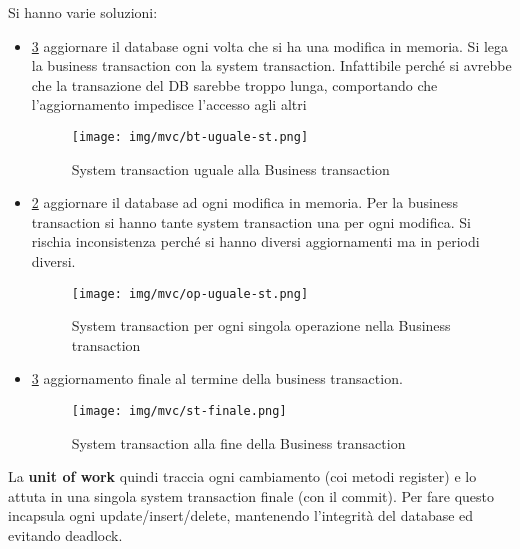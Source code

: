 Si hanno varie soluzioni:
\begin{itemize}
	\item \ref{fig:bt-uguale-st} aggiornare il database ogni volta che si ha una modifica in memoria. 
      Si lega la business transaction con la system transaction. Infattibile 
      perché si avrebbe che la transazione del DB sarebbe troppo lunga, 
      comportando che l'aggiornamento impedisce l'accesso agli altri
      \begin{figure}[!ht]
            \centering
            \texttt{[image: img/mvc/bt-uguale-st.png]}
            \caption{System transaction uguale alla Business transaction}
            \label{fig:bt-uguale-st}
      \end{figure}
	\item \ref{fig:op-uguale-st}  aggiornare il database ad ogni modifica in memoria. Per la business 
      transaction  si hanno tante system transaction una per ogni modifica. Si 
      rischia inconsistenza perché si hanno diversi aggiornamenti ma in periodi 
      diversi.
      \begin{figure}[!ht]
            \centering
            \texttt{[image: img/mvc/op-uguale-st.png]}
            \caption{System transaction per ogni singola operazione nella Business
            transaction}
            \label{fig:op-uguale-st}
      \end{figure}
	\item \ref{fig:bt-uguale-st} aggiornamento finale al termine della business transaction.
      \begin{figure}[!ht]
            \centering
            \texttt{[image: img/mvc/st-finale.png]}
            \caption{System transaction alla fine della Business transaction}
            \label{fig:bt-uguale-st}
      \end{figure}
\end{itemize}
La \textbf{unit of work} quindi traccia ogni cambiamento (coi metodi register) e
lo attuta in una singola system transaction finale (con il commit). Per fare questo incapsula ogni update/insert/delete, mantenendo l'integrità del database ed evitando deadlock.


